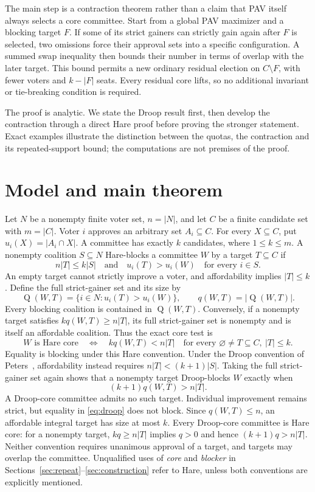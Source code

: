 \documentclass[11pt]{article}
\newcommand{\gain}{\operatorname{Q}}
\begin{document}
The main step is a contraction theorem rather than a claim that PAV
itself always selects a core committee. Start from a global PAV
maximizer and a blocking target $F$. If some of its strict gainers can
strictly gain again after $F$ is selected, two omissions force their
approval sets into a specific configuration. A summed swap inequality
then bounds their number in terms of overlap with the later target.
This bound permits a new ordinary residual election on $C\setminus F$,
with fewer voters and $k-|F|$ seats. Every residual core lifts, so no
additional invariant or tie-breaking condition is required.

The proof is analytic. We state the Droop result first, then develop
the contraction through a direct Hare proof before proving the stronger statement.
Exact examples illustrate the distinction between the quotas, the contraction and its
repeated-support bound; the computations are not premises of the proof.

\section{Model and main theorem}\label{sec:model}
Let $N$ be a nonempty finite voter set, $n=|N|$, and let $C$ be a finite
candidate set with $m=|C|$. Voter $i$ approves an arbitrary set $A_i\subseteq C$.
For every $X\subseteq C$, put $u_i(X)=|A_i\cap X|$. A committee has exactly
$k$ candidates, where $1\le k\le m$. A nonempty coalition $S\subseteq N$
Hare-blocks a committee $W$ by a target $T\subseteq C$ if
\[
 n|T|\le k|S|\quad\text{and}\quad
 u_i(T)>u_i(W)\quad\text{for every }i\in S.
\]
An empty target cannot strictly improve a voter, and affordability implies
$|T|\le k$. Define the full strict-gainer set and its size by
\[
 \gain(W,T)=\{i\in N:u_i(T)>u_i(W)\},\qquad q(W,T)=|\gain(W,T)|.
\]
Every blocking coalition is contained in $\gain(W,T)$. Conversely, if a
nonempty target satisfies $kq(W,T)\ge n|T|$, its full strict-gainer set is
nonempty and is itself an affordable coalition. Thus the exact core test is
\begin{equation}\label{eq:core}
 W\text{ is Hare core}\quad\Longleftrightarrow\quad
 kq(W,T)<n|T|\quad
 \text{for every }\varnothing\ne T\subseteq C,\ |T|\le k.
\end{equation}
Equality is blocking under this Hare convention. Under the Droop
convention of Peters~\cite[Section~6]{Peters2025}, affordability instead
requires $n|T|<(k+1)|S|$. Taking the full strict-gainer set again shows
that a nonempty target Droop-blocks $W$ exactly when
\begin{equation}\label{eq:droop}
 (k+1)q(W,T)>n|T|.
\end{equation}
A Droop-core committee admits no such target. Individual improvement
remains strict, but equality in \eqref{eq:droop} does not block.
Since $q(W,T)\le n$, an affordable integral target has size at most $k$.
Every Droop-core committee is Hare core: for a nonempty target,
$kq\ge n|T|$ implies $q>0$ and hence $(k+1)q>n|T|$.
Neither convention requires unanimous approval of a target, and targets
may overlap the committee. Unqualified uses of \emph{core} and
\emph{blocker} in Sections~\ref{sec:repeat}--\ref{sec:construction}
refer to Hare, unless both conventions are explicitly mentioned.
\end{document}
